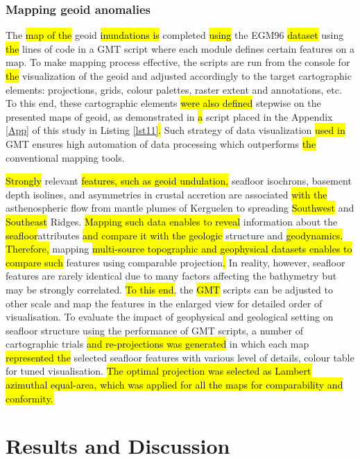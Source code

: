 \documentclass[geomatics,article,submit,pdftex,moreauthors]{Definitions/mdpi}
\begin{document}
\subsubsection{Mapping geoid anomalies}

The \hl{map of the} geoid \hl{inundations is} completed \hl{using} the EGM96 \hl{dataset} using \hl{the }lines of code in a GMT script where each module defines certain features on a map. To make mapping process effective, the scripts are run from the console for \hl{the} visualization of the geoid and adjusted accordingly to the target cartographic elements: projections, grids, colour palettes, raster extent and annotations, etc. To this end,\hl{ }these cartographic elements \hl{were also defined }stepwise on\hl{ }the presented maps of\hl{ }geoid, as demonstrated in \hl{a }script placed in the Appendix \ref{App} of this study in Listing \ref{lst11}\hl{. }Such strategy of data visualization \hl{used in} GMT ensures high automation of data processing which outperforms \hl{the }conventional mapping tools.

\hl{Strongly} relevant \hl{features, such as geoid undulation,} seafloor isochrons, basement depth isolines, and asymmetries in crustal accretion\hl{ }are associated \hl{with the} asthenospheric flow from mantle plumes of Kerguelen to spreading \hl{Southwest} and \hl{Southeast} Ridges. \hl{Mapping such data enables to reveal} information about the \hl{seafloor}attributes \hl{and compare it with the geologic} structure and \hl{geodynamics. Therefore, }mapping \hl{multi-source topographic and geophysical datasets enables to compare such} features using comparable projection\hl{. }In reality, however, seafloor features are rarely identical due to many factors affecting the bathymetry but may be strongly correlated. \hl{To this end}, the \hl{GMT }scripts can be adjusted to other scale and map the features in the enlarged view for detailed order of visualisation. To evaluate the impact of geophysical and geological setting on seafloor structure using the performance of GMT scripts,\hl{ }a number of cartographic trials \hl{ and re-projections was generated }in which each map \hl{represented the }selected seafloor features with various level of details, colour table for tuned visualisation. \hl{The optimal projection was selected as Lambert azimuthal equal-area, which was applied for all the maps for comparability and conformity.}

\section{Results and Discussion}
\end{document}
